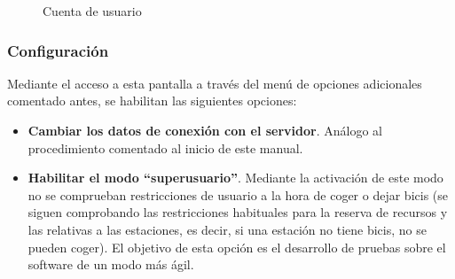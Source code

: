 \begin{figure} [!htb]
	\centering
	\caption{Cuenta de usuario}
	\label{fig:cuentaUsuario}
\end{figure}

\subsubsection{Configuración}

Mediante el acceso a esta pantalla a través del menú de opciones adicionales comentado antes, se habilitan las siguientes opciones:

\begin{itemize}
	\item \textbf{Cambiar los datos de conexión con el servidor}. Análogo al procedimiento comentado al inicio de este manual.
	\item \textbf{Habilitar el modo ``superusuario''}. Mediante la activación de este modo no se comprueban restricciones de usuario a la hora de coger o dejar bicis (se siguen comprobando las restricciones habituales para la reserva de recursos y las relativas a las estaciones, es decir, si una estación no tiene bicis, no se pueden coger). El objetivo de esta opción es el desarrollo de pruebas sobre el software de un modo más ágil.
\end{itemize}

